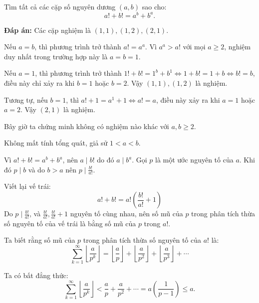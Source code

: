 \ifshowproblemandsoln
\ifshowproblem\begin{problem}\label{problem:MEMO-2015-T-P7}\fi
\ifshowsoln\begin{problem}\fi
    Tìm tất cả các cặp số nguyên dương \( (a, b) \) sao cho:
    \[
        a! + b! = a^b + b^a.
    \]
\end{problem}
\fi

\ifshowsoln
\begin{soln}\footnotemark
    \textbf{Đáp án:} Các cặp nghiệm là \( (1,1), (1,2), (2,1) \).

    Nếu \( a = b \), thì phương trình trở thành \( a! = a^a \). Vì \( a^a > a! \) với mọi \( a \geq 2 \), nghiệm duy nhất trong trường hợp này là \( a = b = 1 \).

    Nếu \( a = 1 \), thì phương trình trở thành \( 1! + b! = 1^b + b^1 \Leftrightarrow 1 + b! = 1 + b \Leftrightarrow b! = b \), 
    điều này chỉ xảy ra khi \( b = 1 \) hoặc \( b = 2 \). Vậy \( (1,1), (1,2) \) là nghiệm.

    Tương tự, nếu \( b = 1 \), thì \( a! + 1 = a^1 + 1 \Leftrightarrow a! = a \), điều này xảy ra khi \( a = 1 \) hoặc \( a = 2 \). Vậy \( (2,1) \) là nghiệm.

    Bây giờ ta chứng minh không có nghiệm nào khác với \( a, b \geq 2 \).

    Không mất tính tổng quát, giả sử \( 1 < a < b \). 

    Vì \( a! + b! = a^b + b^a \), nên $a \mid b!$ do đó $a \mid b^a$.
    Gọi \( p \) là một ước nguyên tố của \( a \). Khi đó \( p \mid b \) và do $b > a$ nên $p \mid \frac{b!}{a!}$.

    Viết lại vế trái:
    \[
        a! + b! = a! \left( \frac{b!}{a!} + 1 \right)
    \]
    Do $p \mid \frac{b!}{a!}$, và \( \frac{b!}{a!}, \frac{b!}{a!} + 1 \) nguyên tố cùng nhau,
    nên số mũ của \( p \) trong phân tích thừa số nguyên tố của vế trái là bằng số mũ của \( p \) trong \( a! \).

    Ta biết rằng số mũ của \( p \) trong phân tích thừa số nguyên tố của \( a! \) là:
    \[
        \sum_{k=1}^{\infty} \left\lfloor \frac{a}{p^k} \right\rfloor =
        \left\lfloor \frac{a}{p} \right\rfloor + \left\lfloor \frac{a}{p^2} \right\rfloor + \left\lfloor \frac{a}{p^3} \right\rfloor + \cdots
    \]

    Ta có bất đẳng thức:
    \[
        \sum_{k=1}^{\infty} \left\lfloor \frac{a}{p^k} \right\rfloor < \frac{a}{p} + \frac{a}{p^2} + \cdots = a\left( \frac{1}{p - 1} \right) \leq a.
    \]


\end{soln}
\end{problem}
